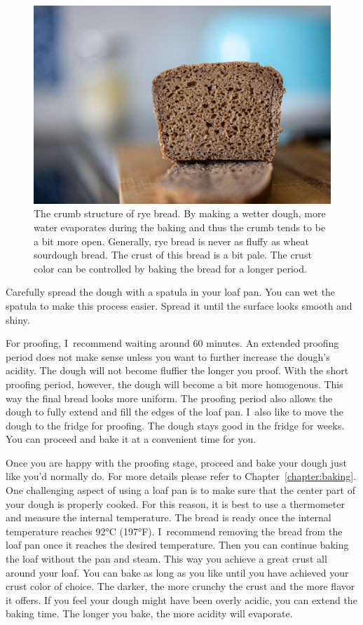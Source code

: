 \begin{figure}[!htb]
  \includegraphics[width=\textwidth]{crumb}
  \caption{The crumb structure of rye bread. By making a wetter
  dough, more water evaporates during the baking and thus the
  crumb tends to be a bit more open. Generally, rye
  bread is never as fluffy as wheat sourdough bread. The crust
  of this bread is a bit pale. The crust color can be controlled
  by baking the bread for a longer period.}
  \label{fig:rye-crumb}
\end{figure}

Carefully spread the dough with a spatula in your loaf pan. You
can wet the spatula to make this process easier. Spread it
until the surface looks smooth and shiny.

For proofing, I~recommend waiting around 60 minutes. An extended
proofing period does not make sense unless you want to further
increase the dough's acidity. The dough will not become fluffier
the longer you proof. With the short proofing period, however,
the dough will become a bit more homogenous. This way the final
bread looks more uniform. The proofing period also allows the
dough to fully extend and fill the edges of the loaf pan. I~also
like to move the dough to the fridge for proofing. The dough stays
good in the fridge for weeks. You can proceed and bake it at a
convenient time for you. 

Once you are happy with the proofing stage, proceed and bake your dough
just like you'd normally do. For more details please refer to 
Chapter~\ref{chapter:baking}. One challenging aspect
of using a loaf pan is to make sure that the center part of your
dough is properly cooked. For this reason, it is best to use a thermometer
and measure the internal temperature. The bread is
ready once the internal temperature reaches 92°C (197°F). I~recommend
removing the bread from the loaf pan once it reaches the desired
temperature. Then you can continue baking the loaf without the pan and
steam. This way you achieve a great crust all around your
loaf. You can bake as long as you like until you have achieved
your crust color of choice. The darker, the more crunchy
the crust and the more flavor it offers. If you feel your
dough might have been overly acidic, you can extend the baking time.
The longer you bake, the more acidity will evaporate.

